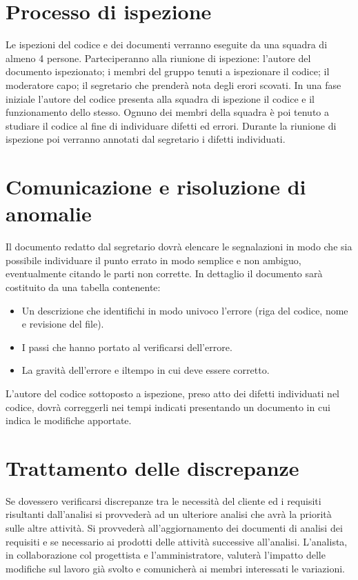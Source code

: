 \documentclass[11pt,titlepage,a4paper]{report}
\begin{document}
\section{Processo di ispezione}
Le ispezioni del codice e dei documenti verranno eseguite da una squadra di almeno 4 persone. Parteciperanno alla riunione di ispezione: l'autore del documento ispezionato; i membri del gruppo tenuti a ispezionare il codice; il moderatore capo; il segretario che prender\`a nota degli erori scovati.
In una fase iniziale l'autore del codice presenta alla squadra di ispezione il codice e il funzionamento dello stesso. Ognuno dei membri della squadra \`e poi tenuto a studiare il codice al fine di individuare difetti ed errori. Durante la riunione di ispezione poi verranno annotati dal segretario i difetti individuati. 
\section{Comunicazione e risoluzione di anomalie}
Il documento redatto dal segretario dovr\`a elencare le segnalazioni in modo che sia possibile individuare il punto errato in modo semplice e non ambiguo, eventualmente citando le parti non corrette. In dettaglio il documento sar\`a costituito da una tabella contenente:
\begin{itemize}
\item Un descrizione che identifichi in modo univoco l'errore (riga del codice, nome e revisione del file).
\item I passi che hanno portato al verificarsi dell'errore.
\item La gravit\`a dell'errore e iltempo in cui deve essere corretto.
\end{itemize}
L'autore del codice sottoposto a ispezione, preso atto dei difetti individuati nel codice, dovr\`a correggerli nei tempi indicati presentando un documento in cui indica le modifiche apportate.

\section{Trattamento delle discrepanze} 
Se dovessero verificarsi discrepanze tra le necessit\`a del cliente ed i requisiti risultanti dall'analisi si provveder\`a ad un ulteriore analisi che avr\`a la priorit\`a sulle altre attivit\`a. Si provveder\`a all'aggiornamento dei documenti di analisi dei requisiti e se necessario ai prodotti delle attivit\`a successive all'analisi. L'analista, in collaborazione col progettista e l'amministratore, valuter\`a l'impatto delle modifiche sul lavoro gi\`a svolto e comunicher\`a ai membri interessati le variazioni.
\end{document}
